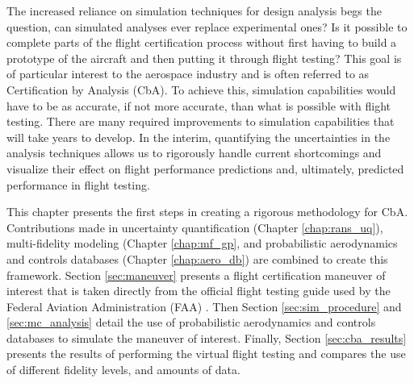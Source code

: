 The increased reliance on simulation techniques for design analysis begs the question, can simulated analyses ever replace experimental ones?
Is it possible to complete parts of the flight certification process without first having to build a prototype of the aircraft and then putting it through flight testing?
This goal is of particular interest to the aerospace industry and is often referred to as Certification by Analysis (CbA).
To achieve this, simulation capabilities would have to be as accurate, if not more accurate, than what is possible with flight testing.  
There are many required improvements to simulation capabilities \cite{slotnick_cfd_nodate} that will take years to develop.
In the interim, quantifying the uncertainties in the analysis techniques allows us to rigorously handle current shortcomings and visualize their effect on flight performance predictions and, ultimately, predicted performance in flight testing.

This chapter presents the first steps in creating a rigorous methodology for CbA.
Contributions made in uncertainty quantification (Chapter \ref{chap:rans_uq}), multi-fidelity modeling (Chapter \ref{chap:mf_gp}, and probabilistic aerodynamics and controls databases (Chapter \ref{chap:aero_db}) are combined to create this framework.
Section \ref{sec:maneuver} presents a flight certification maneuver of interest that is taken directly from the official flight testing guide used by the Federal Aviation Administration (FAA) \cite{romanowski_flight_2018}.
Then Section \ref{sec:sim_procedure} and \ref{sec:mc_analysis} detail the use of probabilistic aerodynamics and controls databases to simulate the maneuver of interest.
Finally, Section \ref{sec:cba_results} presents the results of performing the virtual flight testing and compares the use of different fidelity levels, and amounts of data. 
 